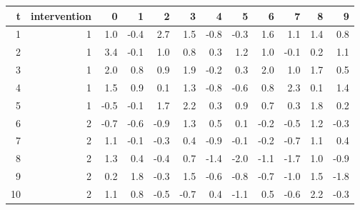 \begin{tabular}{rrrrrrrrrrrr}
\toprule
t & intervention & 0 & 1 & 2 & 3 & 4 & 5 & 6 & 7 & 8 & 9 \\
\midrule
1 & 1 & 1.0 & -0.4 & 2.7 & 1.5 & -0.8 & -0.3 & 1.6 & 1.1 & 1.4 & 0.8 \\
2 & 1 & 3.4 & -0.1 & 1.0 & 0.8 & 0.3 & 1.2 & 1.0 & -0.1 & 0.2 & 1.1 \\
3 & 1 & 2.0 & 0.8 & 0.9 & 1.9 & -0.2 & 0.3 & 2.0 & 1.0 & 1.7 & 0.5 \\
4 & 1 & 1.5 & 0.9 & 0.1 & 1.3 & -0.8 & -0.6 & 0.8 & 2.3 & 0.1 & 1.4 \\
5 & 1 & -0.5 & -0.1 & 1.7 & 2.2 & 0.3 & 0.9 & 0.7 & 0.3 & 1.8 & 0.2 \\
6 & 2 & -0.7 & -0.6 & -0.9 & 1.3 & 0.5 & 0.1 & -0.2 & -0.5 & 1.2 & -0.3 \\
7 & 2 & 1.1 & -0.1 & -0.3 & 0.4 & -0.9 & -0.1 & -0.2 & -0.7 & 1.1 & 0.4 \\
8 & 2 & 1.3 & 0.4 & -0.4 & 0.7 & -1.4 & -2.0 & -1.1 & -1.7 & 1.0 & -0.9 \\
9 & 2 & 0.2 & 1.8 & -0.3 & 1.5 & -0.6 & -0.8 & -0.7 & -1.0 & 1.5 & -1.8 \\
10 & 2 & 1.1 & 0.8 & -0.5 & -0.7 & 0.4 & -1.1 & 0.5 & -0.6 & 2.2 & -0.3 \\
\bottomrule
\end{tabular}
